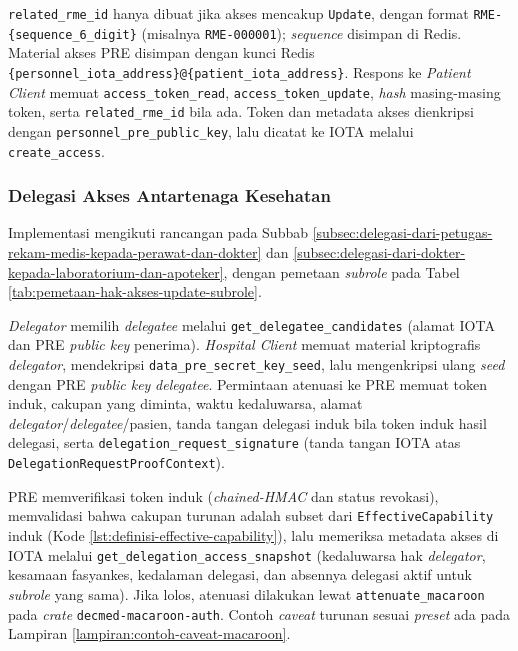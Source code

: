 \documentclass[bahasa, 12pt, a4paper, onecolumn, oneside, final]{report}
\begin{document}
\texttt{related\_rme\_id} hanya dibuat jika akses mencakup \texttt{Update}, dengan format \verb|RME-{sequence_6_digit}| (misalnya \verb|RME-000001|); \textit{sequence} disimpan di Redis. Material akses PRE disimpan dengan kunci Redis \verb|{personnel_iota_address}@{patient_iota_address}|. Respons ke \textit{Patient Client} memuat \texttt{access\_token\_read}, \texttt{access\_token\_update}, \textit{hash} masing-masing token, serta \texttt{related\_rme\_id} bila ada. Token dan metadata akses dienkripsi dengan \texttt{personnel\_pre\_public\_key}, lalu dicatat ke IOTA melalui \texttt{create\_access}.

\subsubsection{Delegasi Akses Antartenaga Kesehatan}
\label{subsubsec:delegasi-akses-antar-tenaga-kesehatan}

Implementasi mengikuti rancangan pada Subbab \ref{subsec:delegasi-dari-petugas-rekam-medis-kepada-perawat-dan-dokter} dan \ref{subsec:delegasi-dari-dokter-kepada-laboratorium-dan-apoteker}, dengan pemetaan \textit{subrole} pada Tabel \ref{tab:pemetaan-hak-akses-update-subrole}.

\textit{Delegator} memilih \textit{delegatee} melalui \texttt{get\_delegatee\_candidates} (alamat IOTA dan PRE \textit{public key} penerima). \textit{Hospital Client} memuat material kriptografis \textit{delegator}, mendekripsi \texttt{data\_pre\_secret\_key\_seed}, lalu mengenkripsi ulang \textit{seed} dengan PRE \textit{public key} \textit{delegatee}. Permintaan atenuasi ke PRE memuat token induk, cakupan yang diminta, waktu kedaluwarsa, alamat \textit{delegator}/\textit{delegatee}/pasien, tanda tangan delegasi induk bila token induk hasil delegasi, serta \texttt{delegation\_request\_signature} (tanda tangan IOTA atas \texttt{DelegationRequestProofContext}).

PRE memverifikasi token induk (\textit{chained-HMAC} dan status revokasi), memvalidasi bahwa cakupan turunan adalah subset dari \texttt{EffectiveCapability} induk (Kode \ref{lst:definisi-effective-capability}), lalu memeriksa metadata akses di IOTA melalui \texttt{get\_delegation\_access\_snapshot} (kedaluwarsa hak \textit{delegator}, kesamaan fasyankes, kedalaman delegasi, dan absennya delegasi aktif untuk \textit{subrole} yang sama). Jika lolos, atenuasi dilakukan lewat \texttt{attenuate\_macaroon} pada \textit{crate} \texttt{decmed-macaroon-auth}. Contoh \textit{caveat} turunan sesuai \textit{preset} ada pada Lampiran \ref{lampiran:contoh-caveat-macaroon}.
\end{document}
